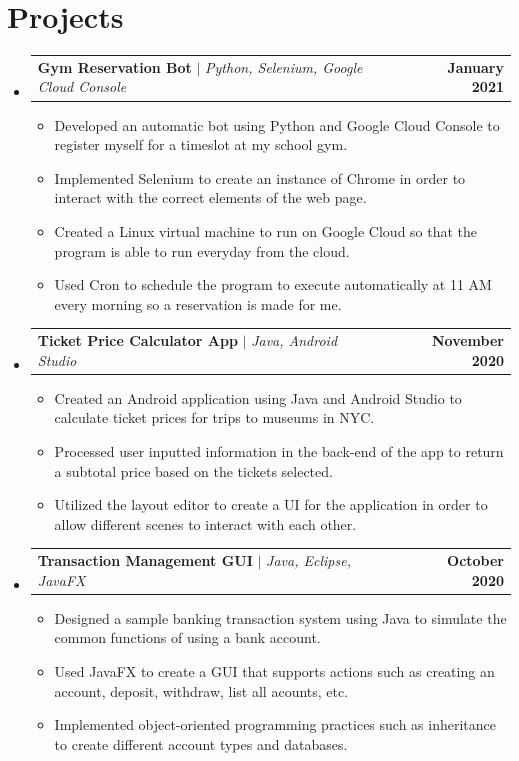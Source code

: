 \documentclass[letterpaper,11pt]{article}
\makeatletter
\newcommand{\resumeItem}[1]{
  \item\small{
    {#1 \vspace{-2pt}}
  }
}
\newcommand{\resumeProjectHeading}[2]{
    \item
    \begin{tabular*}{1.001\textwidth}{l@{\extracolsep{\fill}}r}
      \small#1 & \textbf{\small #2}\\
    \end{tabular*}\vspace{-7pt}
}
\newcommand{\resumeSubHeadingListStart}{\begin{itemize}[leftmargin=0.0in, label={}]}
\newcommand{\resumeSubHeadingListEnd}{\end{itemize}}
\newcommand{\resumeItemListStart}{\begin{itemize}}
\newcommand{\resumeItemListEnd}{\end{itemize}\vspace{-5pt}}
\makeatother
\begin{document}
\section{Projects}
    \vspace{-5pt}
    \resumeSubHeadingListStart
      \resumeProjectHeading
          {\textbf{Gym Reservation Bot} $|$ \emph{Python, Selenium, Google Cloud Console}}{January 2021}
          \resumeItemListStart
            \resumeItem{Developed an automatic bot using Python and Google Cloud Console to register myself for a timeslot at my school gym.}
            \resumeItem{Implemented Selenium to create an instance of Chrome in order to interact with the correct elements of the web page.}
            \resumeItem{Created a Linux virtual machine to run on Google Cloud so that the program is able to run everyday from the cloud.}
            \resumeItem{Used Cron to schedule the program to execute automatically at 11 AM every morning so a reservation is made for me.}
          \resumeItemListEnd
          \vspace{-7pt}
      \resumeProjectHeading
          {\textbf{Ticket Price Calculator App} $|$ \emph{Java, Android Studio}}{November 2020}
          \resumeItemListStart
            \resumeItem{Created an Android application using Java and Android Studio to calculate ticket prices for trips to museums in NYC.}
            \resumeItem{Processed user inputted information in the back-end of the app to return a subtotal price based on the tickets selected.}
            \resumeItem{Utilized the layout editor to create a UI for the application in order to allow different scenes to interact with each other.}
          \resumeItemListEnd 
          \vspace{-7pt}
          \resumeProjectHeading
          {\textbf{Transaction Management GUI} $|$ \emph{Java, Eclipse, JavaFX}}{October 2020}
          \resumeItemListStart
            \resumeItem{Designed a sample banking transaction system using Java to simulate the common functions of using a bank account.}
            \resumeItem{Used JavaFX to create a GUI that supports actions such as creating an account, deposit, withdraw, list all acounts, etc.}
            \resumeItem{Implemented object-oriented programming practices such as inheritance to create different account types and databases.}
          \resumeItemListEnd 
    \resumeSubHeadingListEnd
\vspace{3pt}


%
\end{document}
